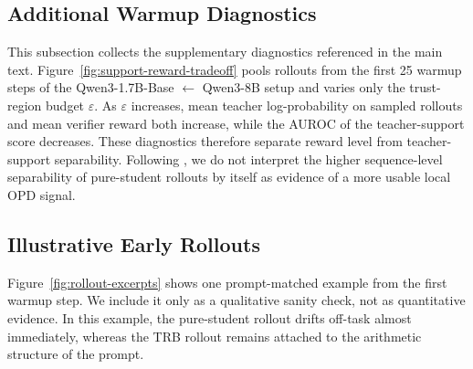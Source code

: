 \documentclass[11pt]{article}
\begin{document}
\subsection{Additional Warmup Diagnostics}
\label{app:warmup_diagnostics}

This subsection collects the supplementary diagnostics referenced in the main text.
Figure~\ref{fig:support-reward-tradeoff} pools rollouts from the first 25 warmup steps of the Qwen3-1.7B-Base $\leftarrow$ Qwen3-8B setup and varies only the trust-region budget $\varepsilon$.
As $\varepsilon$ increases, mean teacher log-probability on sampled rollouts and mean verifier reward both increase, while the AUROC of the teacher-support score decreases.
These diagnostics therefore separate reward level from teacher-support separability.
Following \citet{li2026rethinking}, we do not interpret the higher sequence-level separability of pure-student rollouts by itself as evidence of a more usable local OPD signal.


\subsection{Illustrative Early Rollouts}
\label{app:qualitative_rollouts}

Figure~\ref{fig:rollout-excerpts} shows one prompt-matched example from the first warmup step.
We include it only as a qualitative sanity check, not as quantitative evidence.
In this example, the pure-student rollout drifts off-task almost immediately, whereas the TRB rollout remains attached to the arithmetic structure of the prompt.
\end{document}
